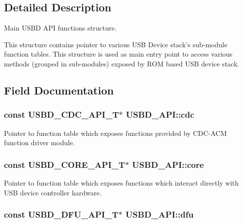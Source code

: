 \subsection{Detailed Description}
Main U\-S\-B\-D A\-P\-I functions structure.

This structure contains pointer to various U\-S\-B Device stack's sub-\/module function tables. This structure is used as main entry point to access various methods (grouped in sub-\/modules) exposed by R\-O\-M based U\-S\-B device stack. 



\subsection{Field Documentation}
\hypertarget{structUSBD__API_a5560686e2f376096d2e1a640bb16bb84}{
\subsubsection[{cdc}]{\setlength{\rightskip}{0pt plus 5cm}const {\bf U\-S\-B\-D\-\_\-\-C\-D\-C\-\_\-\-A\-P\-I\-\_\-\-T}$\ast$ U\-S\-B\-D\-\_\-\-A\-P\-I\-::cdc}}\label{structUSBD__API_a5560686e2f376096d2e1a640bb16bb84}
Pointer to function table which exposes functions provided by C\-D\-C-\/\-A\-C\-M function driver module. \hypertarget{structUSBD__API_a52b343de8166692bd2b4aecfb5eea59d}{
\subsubsection[{core}]{\setlength{\rightskip}{0pt plus 5cm}const {\bf U\-S\-B\-D\-\_\-\-C\-O\-R\-E\-\_\-\-A\-P\-I\-\_\-\-T}$\ast$ U\-S\-B\-D\-\_\-\-A\-P\-I\-::core}}\label{structUSBD__API_a52b343de8166692bd2b4aecfb5eea59d}
Pointer to function table which exposes functions which interact directly with U\-S\-B device controller hardware. \hypertarget{structUSBD__API_ade2d145690a4684babfc683b9cdec47f}{
\subsubsection[{dfu}]{\setlength{\rightskip}{0pt plus 5cm}const {\bf U\-S\-B\-D\-\_\-\-D\-F\-U\-\_\-\-A\-P\-I\-\_\-\-T}$\ast$ U\-S\-B\-D\-\_\-\-A\-P\-I\-::dfu}}\label{structUSBD__API_ade2d145690a4684babfc683b9cdec47f}
